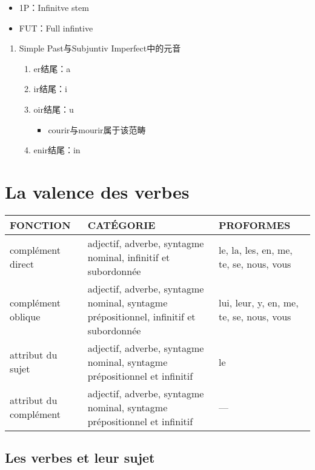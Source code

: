 \documentclass[UTF8]{report}
\begin{document}
\begin{itemize}
    \item 1P：Infinitve stem
    \item FUT：Full infintive
\end{itemize}

\begin{enumerate}
    \item Simple Past与Subjuntiv Imperfect中的元音
    \begin{enumerate}
        \item er结尾：a 
        \item ir结尾：i 
        \item oir结尾：u 
        \begin{itemize}
            \item courir与mourir属于该范畴
        \end{itemize}
        \item enir结尾：in
    \end{enumerate}
\end{enumerate}

\section{La valence des verbes}


\begin{table}[H]
    \centering
    \begin{tabular}{>{\RaggedRight}p{3cm} >{\RaggedRight}p{6.5cm} >{\RaggedRight}p{4cm}}
    \toprule
    \textbf{FONCTION} & \textbf{CATÉGORIE} & \textbf{PROFORMES} \\
    \hline
    complément direct & adjectif, adverbe, syntagme nominal, infinitif et subordonnée & le, la, les, en, me, te, se, nous, vous \\
    \hline
    complément oblique & adjectif, adverbe, syntagme nominal, syntagme prépositionnel, infinitif et subordonnée & lui, leur, y, en, me, te, se, nous, vous \\
    \hline
    {attribut du sujet} & adjectif, adverbe, syntagme nominal, syntagme prépositionnel et infinitif & le \\
    \hline
    attribut du complément & adjectif, adverbe, syntagme nominal, syntagme prépositionnel et infinitif & — \\
    \bottomrule
    \end{tabular}
\end{table}

\subsection{Les verbes et leur sujet}
\end{document}
